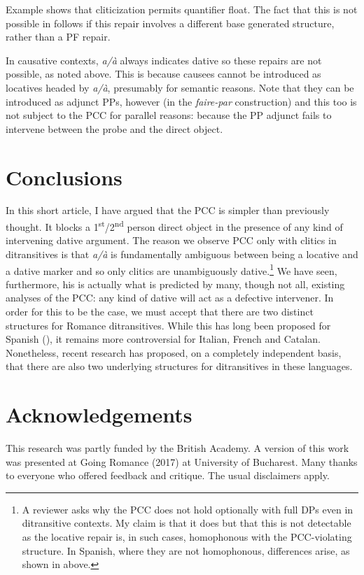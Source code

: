 \documentclass[output=paper,colorlinks,citecolor=brown,nonflat]{./langscibook}
\begin{document}
Example  shows that cliticization permits quantifier float. The fact that this is not possible in  follows if this repair involves a different base generated structure, rather than a PF repair. 

In causative contexts, \textit{a/à} always indicates dative so these repairs are not possible, as noted above. This is because causees cannot be introduced as locatives headed by \textit{a/à}, presumably for semantic reasons. Note that they can be introduced as adjunct PPs, however (in the \textit{faire-par} construction) and this too is not subject to the PCC for parallel reasons: because the PP adjunct fails to intervene between the probe and the direct object. 

\section{Conclusions}\label{sec:sheehan:6}

In this short article, I have argued that the PCC is simpler than previously thought. It blocks a 1\textsuperscript{st}/2\textsuperscript{nd} person direct object in the presence of any kind of intervening dative argument. The reason we observe PCC only with clitics in ditransitives is that \textit{a/à} is fundamentally ambiguous between being a locative and a dative marker and so only clitics are unambiguously dative.\footnote{A reviewer asks why the PCC does not hold optionally with full DPs even in ditransitive contexts. My claim is that it does but that this is not detectable as the locative repair is, in such cases, homophonous with the PCC-violating structure. In Spanish, where they are not homophonous, differences arise, as shown in  above.} We have seen, furthermore, his is actually what is predicted by many, though not all, existing analyses of the PCC: any kind of dative will act as a defective intervener. In order for this to be the case, we must accept that there are two distinct structures for Romance ditransitives. While this has long been proposed for Spanish (\citealt{Demonte1995, Cuervo2003}), it remains more controversial for Italian, French and Catalan. Nonetheless, recent research has proposed, on a completely independent basis, that there are also two underlying structures for ditransitives in these languages. 

\section*{Acknowledgements}

This research was partly funded by the British Academy. A version of this work was presented at Going Romance (2017) at University of Bucharest. Many thanks to everyone who offered feedback and critique. The usual disclaimers apply. 

\sloppy\printbibliography[heading=subbibliography,notkeyword=this]
\end{document}
